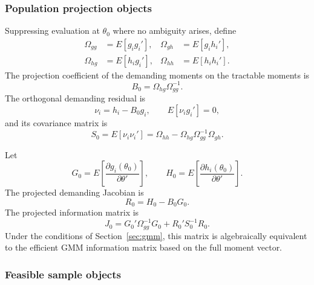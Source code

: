 \subsubsection{Population projection objects}

Suppressing evaluation at $\theta_0$ where no ambiguity arises, define
\begin{align}
 \Omega_{gg} &= E[g_i g_i'],
 &
 \Omega_{gh} &= E[g_i h_i'],
 \nonumber\\
 \Omega_{hg} &= E[h_i g_i'],
 &
 \Omega_{hh} &= E[h_i h_i'].
 \label{eq:app_covariance_blocks}
\end{align}
The projection coefficient of the demanding moments on the tractable moments is
\begin{equation}
 B_0
 =
 \Omega_{hg}\Omega_{gg}^{-1}.
 \label{eq:app_projection_coefficient}
\end{equation}
The orthogonal demanding residual is
\begin{equation}
 \nu_i
 =
 h_i-B_0g_i,
 \qquad
 E[\nu_i g_i']=0,
 \label{eq:app_orthogonal_residual}
\end{equation}
and its covariance matrix is
\begin{equation}
 S_0
 =
 E[\nu_i\nu_i']
 =
 \Omega_{hh}
 -
 \Omega_{hg}\Omega_{gg}^{-1}\Omega_{gh}.
 \label{eq:app_schur_complement}
\end{equation}

Let
\begin{equation}
 G_0
 =
 E\!\left[
 \frac{\partial g_i(\theta_0)}{\partial\theta'}
 \right],
 \qquad
 H_0
 =
 E\!\left[
 \frac{\partial h_i(\theta_0)}{\partial\theta'}
 \right].
 \label{eq:app_jacobians}
\end{equation}
The projected demanding Jacobian is
\begin{equation}
 R_0
 =
 H_0-B_0G_0.
 \label{eq:app_projected_jacobian}
\end{equation}
The projected information matrix is
\begin{equation}
 J_0
 =
 G_0'\Omega_{gg}^{-1}G_0
 +
 R_0'S_0^{-1}R_0.
 \label{eq:app_information_matrix}
\end{equation}
Under the conditions of Section~\ref{sec:gmm}, this matrix is algebraically
equivalent to the efficient GMM information matrix based on the full moment
vector.

\subsubsection{Feasible sample objects}

